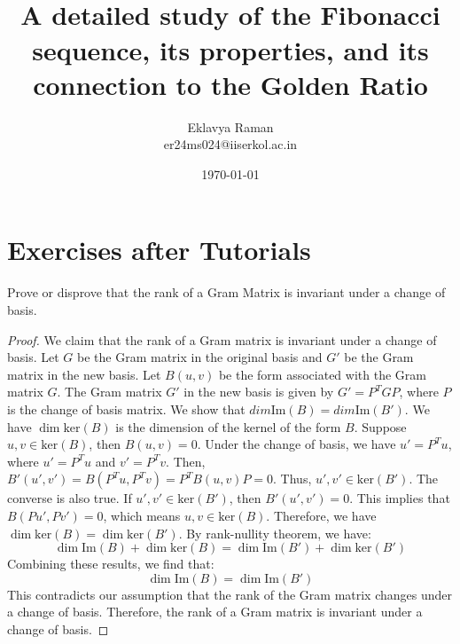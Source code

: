 \documentclass[openany]{book}
\begin{document}
\title{\Large{} \\ \vspace{5pt} 
\large{A detailed study of the Fibonacci sequence, its properties, and its connection to the Golden Ratio}}
\author{Eklavya Raman \\ \vspace{5pt} er24ms024@iiserkol.ac.in \\ \vspace{5pt}}
\date{\today}
\maketitle
\section{Exercises after Tutorials}
\begin{exercise}
    Prove or disprove that the rank of a Gram Matrix is invariant under a change of basis.
\end{exercise}
\begin{proof}
    We claim that the rank of a Gram matrix is invariant under a change of basis.
    Let \( G \) be the Gram matrix in the original basis and \( G' \) be the Gram matrix in the new basis. Let $B(u, v)$ be the form associated with the Gram matrix \( G \). The Gram matrix \( G' \) in the new basis is given by \( G' = P^T G P \), where \( P \) is the change of basis matrix.
    We show that $dim \text{Im}(B) = dim \text{Im}(B')$.
    We have $\dim \text{ker}(B)$ is the dimension of the kernel of the form $B$. Suppose $u, v \in \text{ker}(B)$, then $B(u, v) = 0$. Under the change of basis, we have $u' = P^T u$, where $u' = P^T u$ and $v' = P^T v$. 
    Then, $B'(u', v') = B(P^T u, P^T v) = P^T B(u, v) P = 0$. Thus, $u', v' \in \text{ker}(B')$.
    The converse is also true. If $u', v' \in \text{ker}(B')$, then $B'(u', v') = 0$. This implies that $B(P u', P v') = 0$, which means $u, v \in \text{ker}(B)$.
    Therefore, we have $\dim \text{ker}(B) = \dim \text{ker}(B')$.
    By rank-nullity theorem, we have:
    \[
    \dim \text{Im}(B) + \dim \text{ker}(B) = \dim \text{Im}(B') + \dim \text{ker}(B')
    \]
    Combining these results, we find that:
    \[
    \dim \text{Im}(B) = \dim \text{Im}(B')
    \]
    This contradicts our assumption that the rank of the Gram matrix changes under a change of basis. Therefore, the rank of a Gram matrix is invariant under a change of basis.
\end{proof}
\end{document}
